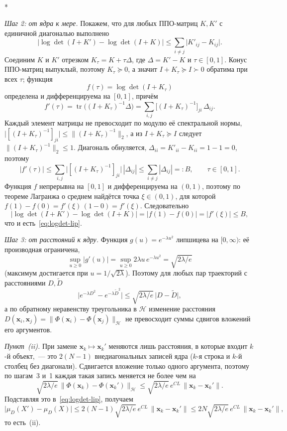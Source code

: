 \documentclass[14pt, a4paper]{extarticle}
\makeatletter
\theoremstyle{definition}
\theoremstyle{plain}
\renewenvironment{proof}[1][\proofname]{\par
    \pushQED{\qed}%
    \normalfont \topsep6\p@\@plus6\p@\relax
    \trivlist
    \item[\hskip\labelsep\itshape #1\@addpunct{.}]\mbox{}\\*
    \ignorespaces
}{\popQED\endtrivlist\@endpefalse}
\makeatother
\begin{document}
\begin{proof}[Доказательство утверждения~\ref{prop:lipschitz}]
\emph{Шаг 2: от ядра к мере.} Покажем, что для любых ППО-матриц $K,K'$ с единичной
диагональю выполнено
\begin{equation}
    \big|\log\det(I+K')-\log\det(I+K)\big|
    \le\sum_{i\ne j}\big|K'_{ij}-K_{ij}\big| .
    \label{eq:logdet-lip}
\end{equation}
Соединим $K$ и $K'$ отрезком $K_\tau=K+\tau\Delta$, где $\Delta=K'-K$ и
$\tau\in[0,1]$. Конус ППО-матриц выпуклый, поэтому $K_\tau\succeq0$, а значит
$I+K_\tau\succeq I\succ0$ обратима при всех $\tau$; функция
\[
    f(\tau)=\log\det(I+K_\tau)
\]
определена и дифференцируема на $[0,1]$, причём
\[
    f'(\tau)=\operatorname{tr}\!\big((I+K_\tau)^{-1}\Delta\big)
    =\sum_{i,j}\big[(I+K_\tau)^{-1}\big]_{ji}\,\Delta_{ij} .
\]
Каждый элемент матрицы не превосходит по модулю её спектральной нормы,
$\big|[(I+K_\tau)^{-1}]_{ji}\big|\le\|(I+K_\tau)^{-1}\|_2$, а из
$I+K_\tau\succeq I$ следует $\|(I+K_\tau)^{-1}\|_2\le1$. Диагональ обнуляется,
$\Delta_{ii}=K'_{ii}-K_{ii}=1-1=0$, поэтому
\[
    |f'(\tau)|
    \le\sum_{i,j}\big|[(I+K_\tau)^{-1}]_{ji}\big|\,|\Delta_{ij}|
    \le\sum_{i\ne j}|\Delta_{ij}|=:B,
    \qquad \tau\in[0,1].
\]
Функция $f$ непрерывна на $[0,1]$ и дифференцируема на $(0,1)$, поэтому по теореме
Лагранжа о среднем найдётся точка $\xi\in(0,1)$, для которой
$f(1)-f(0)=f'(\xi)\,(1-0)=f'(\xi)$. Следовательно
\[
    \big|\log\det(I+K')-\log\det(I+K)\big|
    =|f(1)-f(0)|=|f'(\xi)|\le B,
\]
что и есть~\eqref{eq:logdet-lip}.

\emph{Шаг 3: от расстояний к ядру.} Функция $g(u)=e^{-\lambda u^2}$ липшицева на
$[0,\infty)$: её производная ограничена,
\[
    \sup_{u\ge0}|g'(u)|=\sup_{u\ge0}2\lambda u\,e^{-\lambda u^2}
    =\sqrt{2\lambda/e}
\]
(максимум достигается при $u=1/\sqrt{2\lambda}$). Поэтому для любых пар траекторий
с расстояниями $D,\widetilde D$
\[
    \big|e^{-\lambda D^2}-e^{-\lambda \widetilde D^2}\big|
    \le\sqrt{2\lambda/e}\,\big|D-\widetilde D\big| ,
\]
а по обратному неравенству треугольника в $\mathcal{H}$ изменение расстояния
$D(\mathbf{x}_i,\mathbf{x}_j)=\|\Phi(\mathbf{x}_i)-\Phi(\mathbf{x}_j)\|_{\mathcal{H}}$
не превосходит суммы сдвигов вложений его аргументов.

\emph{Пункт~(ii).} При замене $\mathbf{x}_k\mapsto\mathbf{x}_k'$ меняются лишь
расстояния, в которые входит $k$-й объект,~--- это $2(N-1)$ внедиагональных записей
ядра ($k$-я строка и $k$-й столбец без диагонали). Сдвигается вложение только
одного аргумента, поэтому по шагам~3 и~1 каждая такая запись меняется не более чем на
\[
    \sqrt{2\lambda/e}\,\big\|\Phi(\mathbf{x}_k)-\Phi(\mathbf{x}_k')\big\|_{\mathcal{H}}
    \le\sqrt{2\lambda/e}\,e^{CL}\,\|\mathbf{x}_k-\mathbf{x}_k'\| .
\]
Подставляя это в~\eqref{eq:logdet-lip}, получаем
\[
    \big|\mu_D(X')-\mu_D(X)\big|
    \le 2(N-1)\sqrt{2\lambda/e}\,e^{CL}\,\|\mathbf{x}_k-\mathbf{x}_k'\|
    \le 2N\sqrt{2\lambda/e}\,e^{CL}\,\|\mathbf{x}_k-\mathbf{x}_k'\| ,
\]
то есть~(ii).


\end{proof}
\end{document}
